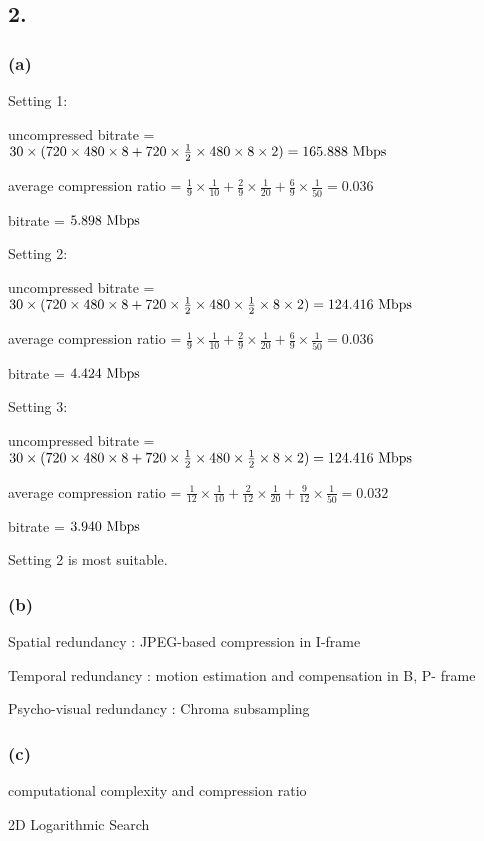 \documentclass{article}
\begin{document}
\subsection*{2.}
\subsubsection*{(a)}
Setting 1:\par
uncompressed bitrate = $30 \times (720 \times 480 \times 8 + 720 \times \frac{1}{2} \times 480 \times 8 \times 2) = 165.888 \ {\rm Mbps}$\par
average compression ratio = $
\frac{1}{9} \times \frac{1}{10}+
\frac{2}{9} \times \frac{1}{20}+
\frac{6}{9} \times \frac{1}{50}
=0.036$\par
bitrate = $5.898 \ {\rm Mbps}$\par\indent
\par
Setting 2:\par
uncompressed bitrate = $30 \times (720 \times 480 \times 8 + 720 \times \frac{1}{2} \times 480 \times \frac{1}{2} \times 8 \times 2) = 124.416 \ {\rm Mbps}$\par
average compression ratio = $
\frac{1}{9} \times \frac{1}{10}+
\frac{2}{9} \times \frac{1}{20}+
\frac{6}{9} \times \frac{1}{50}
=0.036$\par
bitrate = $4.424 \ {\rm Mbps}$\par\indent
\par

Setting 3:\par
uncompressed bitrate = $30 \times (720 \times 480 \times 8 + 720 \times \frac{1}{2} \times 480 \times \frac{1}{2} \times 8 \times 2) = 124.416 \ {\rm Mbps}$\par
average compression ratio = $
\frac{1}{12} \times \frac{1}{10}+
\frac{2}{12} \times \frac{1}{20}+
\frac{9}{12} \times \frac{1}{50}
=0.032$\par
bitrate = $3.940 \ {\rm Mbps}$\par\indent
\par
Setting 2 is most suitable.
\subsubsection*{(b)}
Spatial redundancy : JPEG-based compression in I-frame\par
Temporal redundancy : motion estimation and compensation in B, P- frame\par
Psycho-visual redundancy : Chroma subsampling\par
\subsubsection*{(c)}
computational complexity and compression ratio\par
2D Logarithmic Search
\end{document}
